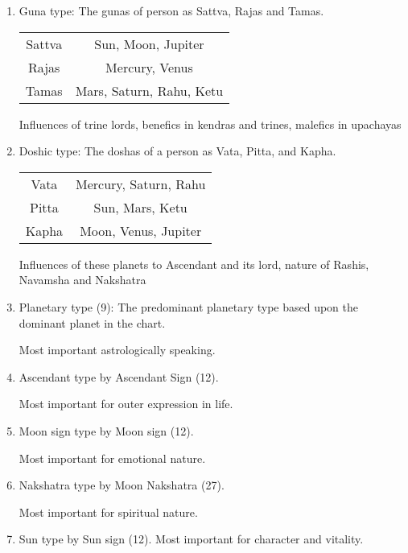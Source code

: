 \begin{enumerate}
\item Guna type: The gunas of person as Sattva, Rajas and Tamas.

\begin{center}
\begin{tabular}{ |c|c| } 
 \hline
Sattva & Sun, Moon, Jupiter \\ 
Rajas & Mercury, Venus \\ 
Tamas & Mars, Saturn, Rahu, Ketu \\ 
 \hline
\end{tabular}
\end{center}
 

Influences of trine lords, benefics in kendras and trines, malefics in upachayas

 

\item Doshic type: The doshas of a person as Vata, Pitta, and Kapha.

\begin{center}
\begin{tabular}{ |c|c| } 
 \hline
Vata & Mercury, Saturn, Rahu \\ 
Pitta & Sun, Mars, Ketu \\ 
Kapha & Moon, Venus, Jupiter \\ 
 \hline
\end{tabular}
\end{center}


Influences of these planets to Ascendant and its lord, nature of Rashis, Navamsha and Nakshatra


 

\item Planetary type (9): The predominant planetary type based upon the dominant planet in the chart.

Most important astrologically speaking.

 

\item Ascendant type by Ascendant Sign (12).

Most important for outer expression in life.

 

\item Moon sign type by Moon sign (12).

Most important for emotional nature.

 

\item Nakshatra type by Moon Nakshatra (27).

Most important for spiritual nature.

 

\item Sun type by Sun sign (12).
    Most important for character and vitality.

\end{enumerate}

